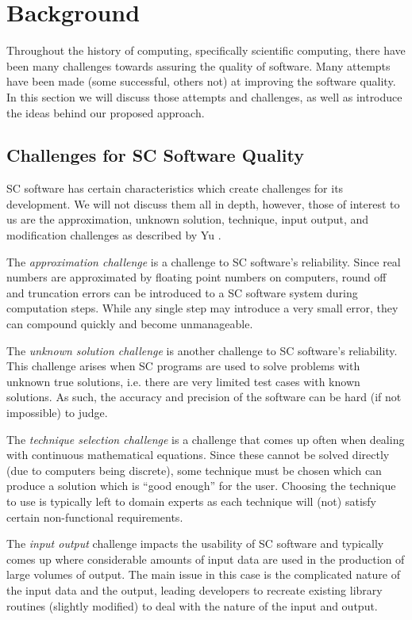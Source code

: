 \documentclass[10pt, preprint]{sigplanconf}
\begin{document}
\section{Background} \label{sec:background}

Throughout the history of computing, specifically scientific computing, there
have been many challenges towards assuring the quality of software. Many
attempts have been made (some successful, others not) at improving the software
quality. In this section we will discuss those attempts and challenges, as well
as introduce the ideas behind our proposed approach.

\subsection{Challenges for SC Software Quality} \label{subsec:challenges}

SC software has certain characteristics which create challenges for its
development. We will not discuss them all in depth, however, those of interest
to us are the approximation, unknown solution, technique, input output, and
modification challenges as described by Yu \cite{Yu2011}.

The \textit{approximation challenge} is a challenge to SC software's
reliability. Since real numbers are approximated by floating point numbers on
computers, round off and truncation errors can be introduced to a SC software
system during computation steps. While any single step may introduce a very
small error, they can compound quickly and become unmanageable.

The \textit{unknown solution challenge} is another challenge to SC software's
reliability. This challenge arises when SC programs are used to solve problems
with unknown true solutions, i.e. there are very limited test cases with known
solutions. As such, the accuracy and precision of the software can be hard (if
not impossible) to judge.

The \textit{technique selection challenge} is a challenge that comes up often
when dealing with continuous mathematical equations. Since these cannot be
solved directly (due to computers being discrete), some technique must be chosen
which can produce a solution which is ``good enough'' for the user. Choosing the
technique to use is typically left to domain experts as each technique will
(not) satisfy certain non-functional requirements.

The \textit{input output} challenge impacts the usability of SC software and
typically comes up where considerable amounts of input data are used in the
production of large volumes of output. The main issue in this case is the
complicated nature of the input data and the output, leading developers to
recreate existing library routines (slightly modified) to deal with the
nature of the input and output.
\end{document}
